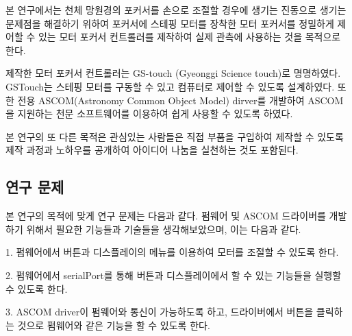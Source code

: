 본 연구에서는 천체 망원경의 포커서를 손으로 조절할 경우에 생기는 진동으로 생기는 문제점을 해결하기 위하여 포커서에 스테핑 모터를 장착한 모터 포커서를 정밀하게 제어할 수 있는 모터 포커서 컨트롤러를 제작하여 실제 관측에 사용하는 것을 목적으로 한다. 

제작한 모터 포커서 컨트롤러는 GS-touch (Gyeonggi Science touch)로 명명하였다. GSTouch는 스테핑 모터를 구동할 수 있고 컴퓨터로 제어할 수 있도록 설계하였다. 또한 전용 ASCOM(Astronomy Common Object Model) dirver를 개발하여 ASCOM을 지원하는 천문 소프트웨어를 이용하여 쉽게 사용할 수 있도록 하였다.

본 연구의 또 다른 목적은 관심있는 사람들은 직접 부품을 구입하여 제작할 수 있도록 제작 과정과 노하우를 공개하여 아이디어 나눔을 실천하는 것도 포함된다.


\subsection{연구 문제}

본 연구의 목적에 맞게 연구 문제는 다음과 같다. 펌웨어 및 ASCOM 드라이버를 개발하기 위해서 필요한 기능들과 기술들을 생각해보았으며, 이는 다음과 같다.

1. 펌웨어에서 버튼과 디스플레이의 메뉴를 이용하여 모터를 조절할 수 있도록 한다.

2. 펌웨어에서 serialPort를 통해 버튼과 디스플레이에서 할 수 있는 기능들을 실행할 수 있도록 한다.

3. ASCOM driver이 펌웨어와 통신이 가능하도록 하고, 드라이버에서 버튼을 클릭하는 것으로 펌웨어와 같은 기능을 할 수 있도록 한다.